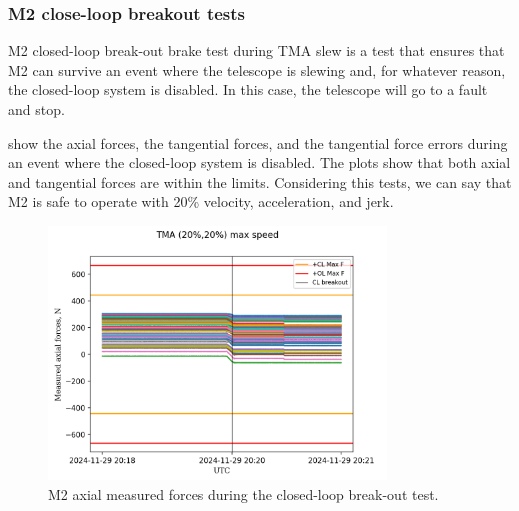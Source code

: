 \subsubsection{M2 close-loop breakout tests}
\label{subsubsec:m2_close_loop_breakout_tests}

 M2 closed-loop break-out brake test during TMA slew is a test that
ensures that M2 can survive an event where the telescope is slewing and, for whatever reason,
the closed-loop system is disabled. In this case, the telescope will go to a fault and stop.

show the axial forces, the tangential forces, and the tangential force errors
during an event where the closed-loop system is disabled. The plots show that both axial and
tangential forces are within the limits. Considering this tests, we can say that M2 is safe to
operate with 20\% velocity, acceleration, and jerk.

\begin{figure}
    \centering
    \includegraphics[width=0.8\textwidth]{spa/20_vel_acc_jerk/BLOCK-T241_m2_axial_measured_forces.png}
    \caption{M2 axial measured forces during the closed-loop break-out test.}
    \label{fig:block241_m2_axial_measured_forces}
    \end{figure}

